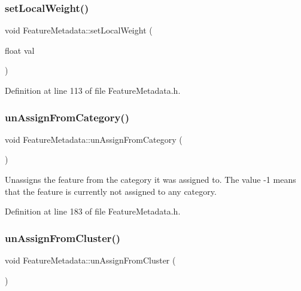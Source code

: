 \subsubsection{\texorpdfstring{set\+Local\+Weight()}{setLocalWeight()}}
{\footnotesize\ttfamily void Feature\+Metadata\+::set\+Local\+Weight (\begin{DoxyParamCaption}\item[{float}]{val }\end{DoxyParamCaption})\hspace{0.3cm}{\ttfamily [inline]}}



Definition at line 113 of file Feature\+Metadata.\+h.

\mbox{\label{class_feature_metadata_a64772c40574899bb2b3985b1bea2a819}} 
\subsubsection{\texorpdfstring{un\+Assign\+From\+Category()}{unAssignFromCategory()}}
{\footnotesize\ttfamily void Feature\+Metadata\+::un\+Assign\+From\+Category (\begin{DoxyParamCaption}{ }\end{DoxyParamCaption})\hspace{0.3cm}{\ttfamily [inline]}}

Unassigns the feature from the category it was assigned to. The value -\/1 means that the feature is currently not assigned to any category. 

Definition at line 183 of file Feature\+Metadata.\+h.

\mbox{\label{class_feature_metadata_a203acc4e77eaf40cb42ac446c92af241}} 
\subsubsection{\texorpdfstring{un\+Assign\+From\+Cluster()}{unAssignFromCluster()}}
{\footnotesize\ttfamily void Feature\+Metadata\+::un\+Assign\+From\+Cluster (\begin{DoxyParamCaption}{ }\end{DoxyParamCaption})\hspace{0.3cm}{\ttfamily [inline]}}

